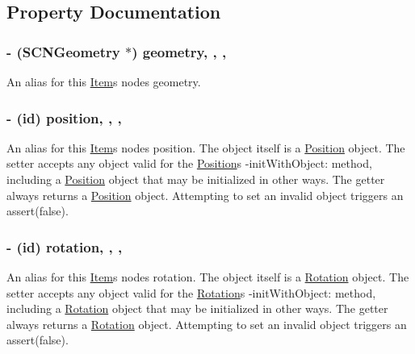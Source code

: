 \subsection{Property Documentation}
\hypertarget{interface_item_ad5a21ef3fab7a28054d4f55e4ea3033e}{}
\subsubsection[{geometry}]{\setlength{\rightskip}{0pt plus 5cm}-\/ (S\+C\+N\+Geometry $\ast$) geometry\hspace{0.3cm}{\ttfamily [read]}, {\ttfamily [write]}, {\ttfamily [nonatomic]}, {\ttfamily [strong]}}\label{interface_item_ad5a21ef3fab7a28054d4f55e4ea3033e}
An alias for this \hyperlink{interface_item}{Item}\textquotesingle{}s node\textquotesingle{}s geometry. \hypertarget{interface_item_ace1d57af2155384a08ebfeb1058cb0ed}{}
\subsubsection[{position}]{\setlength{\rightskip}{0pt plus 5cm}-\/ (id) position\hspace{0.3cm}{\ttfamily [read]}, {\ttfamily [write]}, {\ttfamily [nonatomic]}, {\ttfamily [strong]}}\label{interface_item_ace1d57af2155384a08ebfeb1058cb0ed}
An alias for this \hyperlink{interface_item}{Item}\textquotesingle{}s node\textquotesingle{}s position. The object itself is a \hyperlink{interface_position}{Position} object. The setter accepts any object valid for the \hyperlink{interface_position}{Position}\textquotesingle{}s {\ttfamily -\/init\+With\+Object}\+: method, including a \hyperlink{interface_position}{Position} object that may be initialized in other ways. The getter always returns a \hyperlink{interface_position}{Position} object. Attempting to set an invalid object triggers an {\ttfamily assert(false)}. \hypertarget{interface_item_abaf73184e4f6475c1cc319cba250d5ad}{}
\subsubsection[{rotation}]{\setlength{\rightskip}{0pt plus 5cm}-\/ (id) rotation\hspace{0.3cm}{\ttfamily [read]}, {\ttfamily [write]}, {\ttfamily [nonatomic]}, {\ttfamily [strong]}}\label{interface_item_abaf73184e4f6475c1cc319cba250d5ad}
An alias for this \hyperlink{interface_item}{Item}\textquotesingle{}s node\textquotesingle{}s rotation. The object itself is a \hyperlink{interface_rotation}{Rotation} object. The setter accepts any object valid for the \hyperlink{interface_rotation}{Rotation}\textquotesingle{}s {\ttfamily -\/init\+With\+Object}\+: method, including a \hyperlink{interface_rotation}{Rotation} object that may be initialized in other ways. The getter always returns a \hyperlink{interface_rotation}{Rotation} object. Attempting to set an invalid object triggers an {\ttfamily assert(false)}. \hypertarget{interface_item_a97f005fe980112511b6d5da41bd53beb}{}
